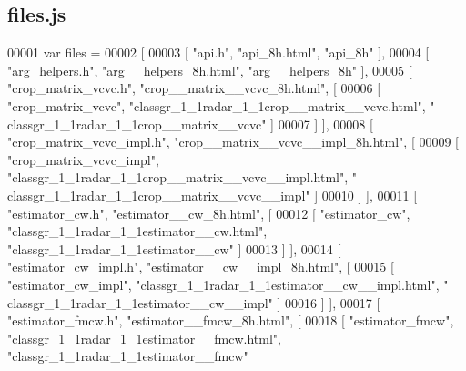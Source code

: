\subsection{files.\+js}
\label{files_8js_source}

\begin{DoxyCode}
00001 var files =
00002 [
00003     [ \textcolor{stringliteral}{"api.h"}, \textcolor{stringliteral}{"api\_8h.html"}, \textcolor{stringliteral}{"api\_8h"} ],
00004     [ \textcolor{stringliteral}{"arg\_helpers.h"}, \textcolor{stringliteral}{"arg\_\_helpers\_8h.html"}, \textcolor{stringliteral}{"arg\_\_helpers\_8h"} ],
00005     [ \textcolor{stringliteral}{"crop\_matrix\_vcvc.h"}, \textcolor{stringliteral}{"crop\_\_matrix\_\_vcvc\_8h.html"}, [
00006       [ \textcolor{stringliteral}{"crop\_matrix\_vcvc"}, \textcolor{stringliteral}{"classgr\_1\_1radar\_1\_1crop\_\_matrix\_\_vcvc.html"}, \textcolor{stringliteral}{"
      classgr\_1\_1radar\_1\_1crop\_\_matrix\_\_vcvc"} ]
00007     ] ],
00008     [ \textcolor{stringliteral}{"crop\_matrix\_vcvc\_impl.h"}, \textcolor{stringliteral}{"crop\_\_matrix\_\_vcvc\_\_impl\_8h.html"}, [
00009       [ \textcolor{stringliteral}{"crop\_matrix\_vcvc\_impl"}, \textcolor{stringliteral}{"classgr\_1\_1radar\_1\_1crop\_\_matrix\_\_vcvc\_\_impl.html"}, \textcolor{stringliteral}{"
      classgr\_1\_1radar\_1\_1crop\_\_matrix\_\_vcvc\_\_impl"} ]
00010     ] ],
00011     [ \textcolor{stringliteral}{"estimator\_cw.h"}, \textcolor{stringliteral}{"estimator\_\_cw\_8h.html"}, [
00012       [ \textcolor{stringliteral}{"estimator\_cw"}, \textcolor{stringliteral}{"classgr\_1\_1radar\_1\_1estimator\_\_cw.html"}, \textcolor{stringliteral}{"classgr\_1\_1radar\_1\_1estimator\_\_cw"} ]
00013     ] ],
00014     [ \textcolor{stringliteral}{"estimator\_cw\_impl.h"}, \textcolor{stringliteral}{"estimator\_\_cw\_\_impl\_8h.html"}, [
00015       [ \textcolor{stringliteral}{"estimator\_cw\_impl"}, \textcolor{stringliteral}{"classgr\_1\_1radar\_1\_1estimator\_\_cw\_\_impl.html"}, \textcolor{stringliteral}{"
      classgr\_1\_1radar\_1\_1estimator\_\_cw\_\_impl"} ]
00016     ] ],
00017     [ \textcolor{stringliteral}{"estimator\_fmcw.h"}, \textcolor{stringliteral}{"estimator\_\_fmcw\_8h.html"}, [
00018       [ \textcolor{stringliteral}{"estimator\_fmcw"}, \textcolor{stringliteral}{"classgr\_1\_1radar\_1\_1estimator\_\_fmcw.html"}, \textcolor{stringliteral}{"classgr\_1\_1radar\_1\_1estimator\_\_fmcw"}

\end{DoxyCode}
